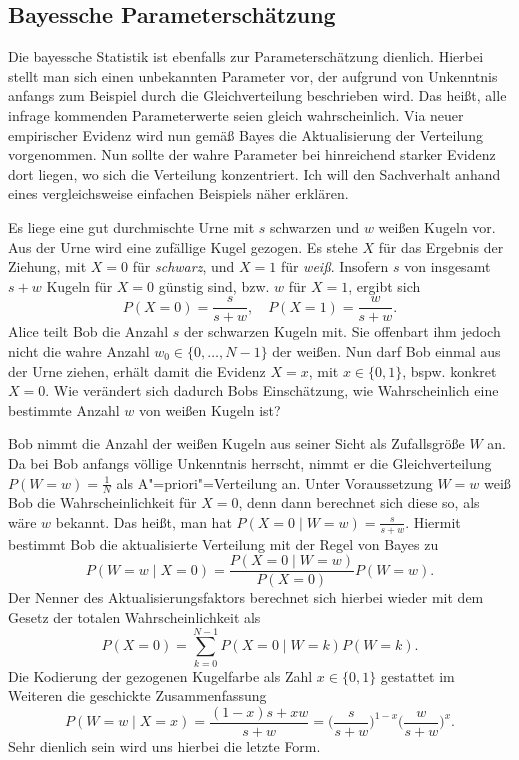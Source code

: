 \subsection{Bayessche Parameterschätzung}

Die bayessche Statistik ist ebenfalls zur Parameterschätzung dienlich.
Hierbei stellt man sich einen unbekannten Parameter vor, der aufgrund
von Unkenntnis anfangs zum Beispiel durch die Gleichverteilung
beschrieben wird. Das heißt, alle infrage kommenden Parameterwerte
seien gleich wahrscheinlich. Via neuer empirischer Evidenz wird nun
gemäß Bayes die Aktualisierung der Verteilung vorgenommen. Nun sollte
der wahre Parameter bei hinreichend starker Evidenz dort liegen, wo
sich die Verteilung konzentriert. Ich will den Sachverhalt anhand eines
vergleichsweise einfachen Beispiels näher erklären.

Es liege eine gut durchmischte Urne mit $s$ schwarzen und $w$ weißen
Kugeln vor. Aus der Urne wird eine zufällige Kugel gezogen. Es stehe
$X$ für das Ergebnis der Ziehung, mit $X=0$ für \emph{schwarz}, und
$X=1$ für \emph{weiß}. Insofern $s$ von insgesamt $s+w$ Kugeln für
$X=0$ günstig sind, bzw. $w$ für $X=1$, ergibt sich
\[P(X=0)=\frac{s}{s+w},\quad P(X=1)=\frac{w}{s+w}.\]
Alice teilt Bob die Anzahl $s$ der schwarzen Kugeln mit. Sie offenbart
ihm jedoch nicht die wahre Anzahl $w_0\in\{0,\ldots,N-1\}$ der
weißen. Nun darf Bob einmal aus der Urne ziehen, erhält damit die
Evidenz $X=x$, mit $x\in\{0,1\}$, bspw. konkret $X=0$. Wie verändert
sich dadurch Bobs Einschätzung, wie Wahrscheinlich eine bestimmte Anzahl
$w$ von weißen Kugeln ist?

Bob nimmt die Anzahl der weißen Kugeln aus seiner Sicht als Zufallsgröße
$W$ an. Da bei Bob anfangs völlige Unkenntnis herrscht, nimmt
er die Gleichverteilung $P(W=w)=\frac{1}{N}$ als A"=priori"=Verteilung
an. Unter Voraussetzung $W=w$ weiß Bob die Wahrscheinlichkeit für
$X=0$, denn dann berechnet sich diese so, als wäre $w$ bekannt.
Das heißt, man hat $P(X=0\mid W=w)=\frac{s}{s+w}$. Hiermit bestimmt
Bob die aktualisierte Verteilung mit der Regel von Bayes zu
\[P(W=w\mid X=0) = \frac{P(X=0\mid W=w)}{P(X=0)}P(W=w).\]
Der Nenner des Aktualisierungsfaktors berechnet sich hierbei wieder mit
dem Gesetz der totalen Wahrscheinlichkeit als
\[P(X=0) = \sum_{k=0}^{N-1}P(X=0\mid W=k)P(W=k).\]
Die Kodierung der gezogenen Kugelfarbe als Zahl $x\in\{0,1\}$ gestattet
im Weiteren die geschickte Zusammenfassung
\[P(W=w\mid X=x) = \frac{(1-x)s+xw}{s+w}
= \Big(\frac{s}{s+w}\Big)^{1-x}\Big(\frac{w}{s+w}\Big)^x.\]
Sehr dienlich sein wird uns hierbei die letzte Form.

